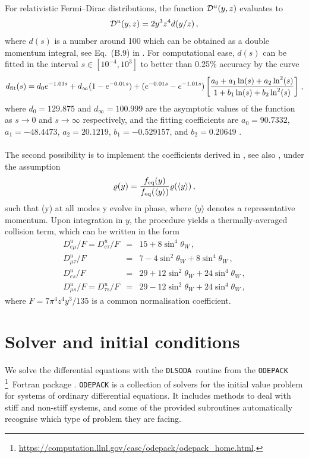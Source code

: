 \documentclass[notitlepage,nofootinbib,showpacs,preprintnumbers,amsmath,amssymb,superscriptaddress,prd,onecolumn]{revtex4-1}
\newcommand{\dlsoda}{\texttt{DLSODA}}
\begin{document}
For relativistic Fermi--Dirac distributions, the function ${\cal D}^u(y,z)$ evaluates to
\begin{equation}
{\cal D}^u(y,z) = 2 y^3 z^4 d(y/z)\,,
\label{eq:dy}
\end{equation}
where $d(s)$ is a number around 100 which can be obtained as a double momentum integral,
see Eq.~(B.9) in \cite{Bennett:2020zkv}.
For computational ease,
$d(s)$ can be fitted in the interval $s \in [10^{-4},10^3]$ to better than 0.25\% accuracy by the curve
\begin{equation}
d_{\rm fit}(s)
=
d_0 e^{-1.01 s}
+
d_\infty (1- e^{-0.01 s})
+
(e^{-0.01 s}-e^{-1.01 s})
\left[
\frac{a_0 + a_1 \ln  (s) + a_2 \ln^2(s)}{1 + b_1 \ln  (s) + b_2 \ln^2(s)}
\right]\,,
\label{eq:fittingfunctiondy}
\end{equation}
where $d_0 = 129.875$ and $d_\infty = 100.999$ are the asymptotic values of the function as $s \to 0$ and
$s \to \infty$ respectively, and the fitting coefficients are
$a_0 = 90.7332$, $a_1 = -48.4473$, $a_2 =20.1219$,
$b_1 = -0.529157$, and $b_2 = 0.20649$ \cite{Bennett:2020zkv}.



\paragraph{}
The second possibility is to implement the coefficients derived in \cite{McKellar:1992ja},
see also \cite{Enqvist:1991qj,Bell:1998ds},
under the assumption
\begin{equation}
\varrho(y)
=
\frac{
f_{\rm eq}(y)
}{
f_{\rm eq}(\langle y\rangle)
}
\varrho(\langle y\rangle)\,,
\end{equation}
such that (y) at all modes y evolve in phase,
where $\langle y\rangle$ denotes a representative momentum.
Upon integration in $y$,
the procedure yields a thermally-averaged collision term,
which can be written in the form
%
\begin{eqnarray}
D^u_{e\mu}/F=D^u_{e\tau}/F & = & 15 + 8\sin^4\theta_W\,,\\
D^u_{\mu\tau}/F & = & 7 - 4\sin^2\theta_W + 8\sin^4\theta_W\,,\\
D^u_{es}/F & = & 29 + 12\sin^2\theta_W + 24\sin^4\theta_W\,,\\
D^u_{\mu s}/F = D^u_{\tau s}/F & = & 29 - 12\sin^2\theta_W + 24\sin^4\theta_W\,,
\end{eqnarray}
where
$F=7\pi^4 z^4 y^3/135$ is a common normalisation coefficient.


\section{Solver and initial conditions}
\label{ssec:solver}
We solve the differential equations with the \dlsoda\ routine
from the \texttt{ODEPACK}%
\footnote{\url{https://computation.llnl.gov/casc/odepack/odepack_home.html}.}\
Fortran package \cite{hindmarsh1982odepack,dlsoda1}.
\texttt{ODEPACK} is a collection of solvers for the initial value problem for systems of ordinary differential equations.
It includes methods to deal with stiff and non-stiff systems, and some of the provided subroutines
automatically recognise which type of problem they are facing.
\end{document}
